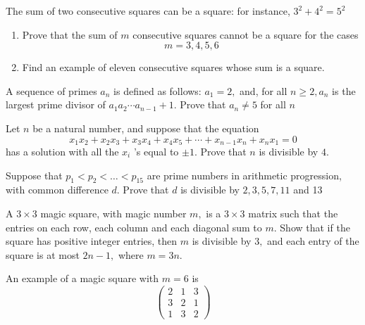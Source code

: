 \documentclass{pset}
\begin{document}
\begin{problems}
\begin{problem}[IrMO 1991 Q6]
    The sum of two consecutive squares can be a square: for instance, \(3^{2}+4^{2}=5^{2}\)
    \begin{enumerate}
    \item Prove that the sum of \(m\) consecutive squares cannot be a square for the cases
    $$
    m=3,4,5,6
    $$
    \item Find an example of eleven consecutive squares whose sum is a square.
\end{enumerate}
\end{problem}

\begin{problem}[IrMO 1990 Q2]
    A sequence of primes \(a_{n}\) is defined as follows: \(a_{1}=2,\) and, for all \(n \geq 2, a_{n}\) is the largest prime divisor of \(a_{1} a_{2} \cdots a_{n-1}+1 .\) Prove that \(a_{n} \neq 5\) for all \(n\)
\end{problem}

\begin{problem}[IrMO 1990 Q6]
    Let \(n\) be a natural number, and suppose that the equation
    $$
    x_{1} x_{2}+x_{2} x_{3}+x_{3} x_{4}+x_{4} x_{5}+\cdots+x_{n-1} x_{n}+x_{n} x_{1}=0
    $$
    has a solution with all the \(x_{i}\) 's equal to \(\pm 1 .\) Prove that \(n\) is divisible by \(4 .\)
\end{problem}

\begin{problem}[IRMO 1990 Q7]
    Suppose that \(p_{1}<p_{2}<\ldots<p_{15}\) are prime numbers in arithmetic progression, with common difference \(d .\) Prove that \(d\) is divisible by \(2,3,5,7,11\) and 13
\end{problem}

\begin{problem}[IrMO 1989 Q2]
    A \(3 \times 3\) magic square, with magic number \(m,\) is a \(3 \times 3\) matrix such that the entries on each row, each column and each diagonal sum to \(m .\) Show that if the square has positive integer entries, then \(m\) is divisible by \(3,\) and each entry of the square is at most \(2 n-1,\) where \(m=3 n .\) 
    
    An example of a magic square with \(m=6\) is
$$
\begin{pmatrix}
    {2} & {1} & {3} \\
{3} & {2} & {1} \\
{1} & {3} & {2}
\end{pmatrix}
$$
\end{problem}


\end{problems}
\end{document}
